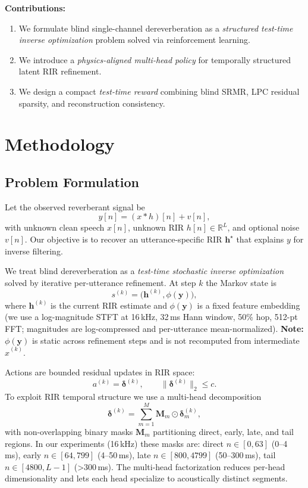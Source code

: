 \documentclass[10pt,conference]{IEEEtran}
\begin{document}
\textbf{Contributions:}
\begin{enumerate}
  \item We formulate blind single-channel dereverberation as a \emph{structured test-time inverse optimization} problem solved via reinforcement learning.
  \item We introduce a \emph{physics-aligned multi-head policy} for temporally structured latent RIR refinement.
  \item We design a compact \emph{test-time reward} combining blind SRMR, LPC residual sparsity, and reconstruction consistency.
\end{enumerate}

\section{Methodology}

\subsection{Problem Formulation}

Let the observed reverberant signal be
\begin{equation}
\label{eq:observation_model}
y[n]=(x*h)[n]+v[n],
\end{equation}
with unknown clean speech \(x[n]\), unknown RIR \(h[n]\in\mathbb{R}^L\), and optional noise \(v[n]\). Our objective is to recover an utterance-specific RIR \(\mathbf{h}^\star\) that explains \(y\) for inverse filtering.

We treat blind dereverberation as a \emph{test-time stochastic inverse optimization} solved by iterative per-utterance refinement. At step \(k\) the Markov state is
\begin{equation}
\label{eq:state}
s^{(k)}=\big(\mathbf{h}^{(k)},\phi(\mathbf{y})\big),
\end{equation}
where \(\mathbf{h}^{(k)}\) is the current RIR estimate and \(\phi(\mathbf{y})\) is a fixed feature embedding (we use a log-magnitude STFT at 16\,kHz, 32\,ms Hann window, 50\% hop, 512-pt FFT; magnitudes are log-compressed and per-utterance mean-normalized). \textbf{Note:} \(\phi(\mathbf{y})\) is static across refinement steps and is not recomputed from intermediate \(\hat{x}^{(k)}\).

Actions are bounded residual updates in RIR space:
\begin{equation}
\label{eq:action}
a^{(k)}=\boldsymbol{\delta}^{(k)},\qquad \|\boldsymbol{\delta}^{(k)}\|_2\le c.
\end{equation}
To exploit RIR temporal structure we use a multi-head decomposition
\begin{equation}
\label{eq:delta_decomp}
\boldsymbol{\delta}^{(k)}=\sum_{m=1}^M\mathbf{M}_m\odot\boldsymbol{\delta}^{(k)}_m,
\end{equation}
with non-overlapping binary masks \(\mathbf{M}_m\) partitioning direct, early, late, and tail regions. In our experiments (16\,kHz) these masks are: direct \(n\in[0,63]\) (0--4\,ms), early \(n\in[64,799]\) (4--50\,ms), late \(n\in[800,4799]\) (50--300\,ms), tail \(n\in[4800,L-1]\) (>300\,ms). The multi-head factorization reduces per-head dimensionality and lets each head specialize to acoustically distinct segments.
\end{document}
